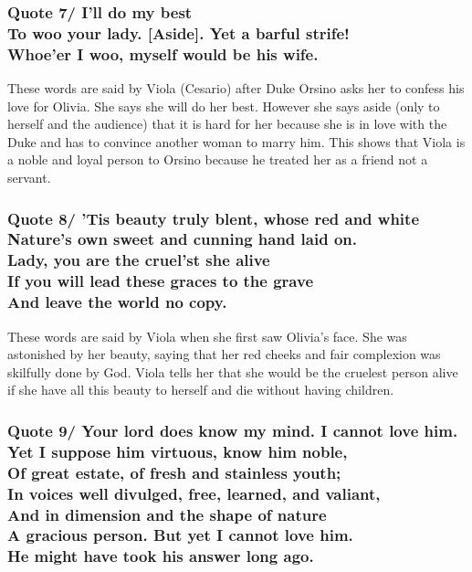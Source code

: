 \documentclass[12pt, a4paper]{article}
\begin{document}
\subsubsection*{Quote 7/
I’ll do my best\\
To woo your lady. [Aside]. Yet a barful strife!\\
Whoe’er I woo, myself would be his wife.
}

These words are said by Viola (Cesario) after Duke Orsino asks her
to confess his love for Olivia. She says she will do her best. However
she says aside (only to herself and the audience) that it is hard for
her because she is in love with the Duke and has to convince another 
woman to marry him. This shows that Viola is a noble and loyal
person to Orsino because he treated her as a friend not a servant.

\subsubsection*{Quote 8/
’Tis beauty truly blent, whose red and white\\
Nature’s own sweet and cunning hand laid on.\\
Lady, you are the cruel’st she alive\\
If you will lead these graces to the grave\\
And leave the world no copy.
}

These words are said by Viola when she first saw Olivia's face.
She was astonished by her beauty, saying that her red cheeks
and fair complexion was skilfully done by God. Viola tells her that 
she would be the cruelest person alive if she have all this 
beauty to herself and die without having children.

\subsubsection*{Quote 9/
Your lord does know my mind. I cannot love him.\\
Yet I suppose him virtuous, know him noble,\\
Of great estate, of fresh and stainless youth;\\
In voices well divulged, free, learned, and valiant,\\
And in dimension and the shape of nature\\
A gracious person. But yet I cannot love him.\\
He might have took his answer long ago.
}
\end{document}
